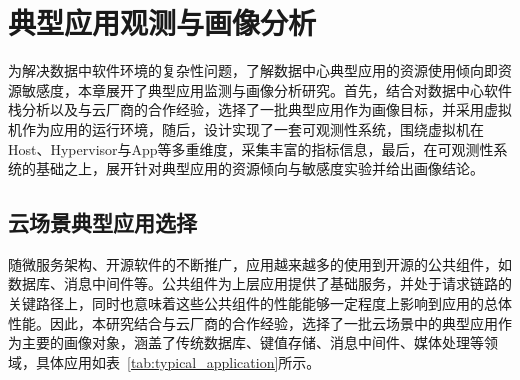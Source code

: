 \chapter{典型应用观测与画像分析}\label{chap:profiling}





为解决数据中软件环境的复杂性问题，了解数据中心典型应用的资源使用倾向即资源敏感度，本章展开了典型应用监测与画像分析研究。首先，结合对数据中心软件栈分析以及与云厂商的合作经验，选择了一批典型应用作为画像目标，并采用虚拟机作为应用的运行环境，随后，设计实现了一套可观测性系统，围绕虚拟机在Host、Hypervisor与App等多重维度，采集丰富的指标信息，最后，在可观测性系统的基础之上，展开针对典型应用的资源倾向与敏感度实验并给出画像结论。

\section{云场景典型应用选择}


随微服务架构、开源软件的不断推广，应用越来越多的使用到开源的公共组件，如数据库、消息中间件等。公共组件为上层应用提供了基础服务，并处于请求链路的关键路径上，同时也意味着这些公共组件的性能能够一定程度上影响到应用的总体性能。因此，本研究结合与云厂商的合作经验，选择了一批云场景中的典型应用作为主要的画像对象，涵盖了传统数据库、键值存储、消息中间件、媒体处理等领域，具体应用如表~\ref{tab:typical_application}所示。


